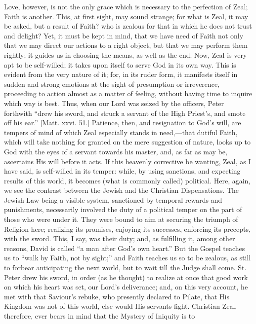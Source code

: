Love, however, is not the only grace which is necessary to the
perfection of Zeal; Faith is another. This, at first sight, may sound
strange; for what is Zeal, it may be asked, but a result of Faith? who
is zealous for that in which he does not trust and delight? Yet, it must
be kept in mind, that we have need of Faith not only that we may direct
our actions to a right object, but that we may perform them rightly; it
guides us in choosing the means, as well as the end. Now, Zeal is very
apt to be self-willed; it takes upon itself to serve God in its own way.
This is evident from the very nature of it; for, in its ruder form, it
manifests itself in sudden and strong emotions at the sight of
presumption or irreverence, proceeding to action almost as a matter of
feeling, without having time to inquire which way is best. Thus, when
our Lord was seized by the officers, Peter forthwith ``drew his
sword, and struck a servant of the High Priest's, and smote off his
ear.'' [Matt. xxvi. 51.] Patience, then, and resignation to God's
will, are tempers of mind of which Zeal especially stands in need,—that
dutiful Faith, which will take nothing for granted on the mere
suggestion of nature, looks up to God with the eyes of a servant towards
his master, and, as far as may be, ascertains His will before it acts.
If this heavenly corrective be wanting, Zeal, as I have said, is
self-willed in its temper: while, by using sanctions, and expecting
results of this world, it becomes (what is commonly called) political.
Here, again, we see the contrast between the Jewish and the Christian
Dispensations. The Jewish Law being a visible system, sanctioned by
temporal rewards and punishments, necessarily involved the duty of a
political temper on the part of those who were under it. They were bound
to aim at securing the triumph of Religion here; realizing its promises,
enjoying its successes, enforcing its precepts, with the sword. This, I
say, was their duty; and, as fulfilling it, among other reasons, David
is called ``a man after God's own heart.'' But the Gospel
teaches us to ``walk by Faith, not by sight;'' and Faith teaches
us so to be zealous, as still to forbear anticipating the next world,
but to wait till the Judge shall come. St. Peter drew his sword, in
order (as he thought) to realize at once that good work on which his
heart was set, our Lord's deliverance; and, on this very account, he met
with that Saviour's rebuke, who presently declared to Pilate, that His
Kingdom was not of this world, else would His servants fight. Christian
Zeal, therefore, ever bears in mind that the Mystery of Iniquity is to
